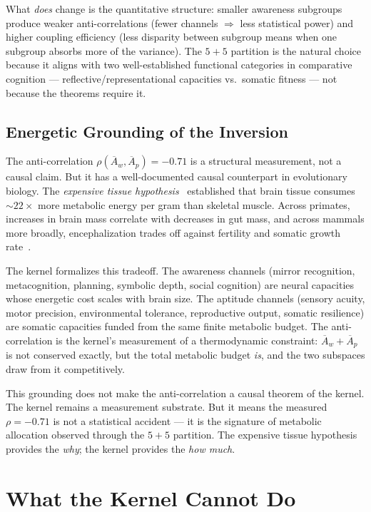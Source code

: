 \documentclass[
  aps,
  prd,
  twocolumn,
  superscriptaddress,
  nofootinbib,
  floatfix
]{revtex4-2}
\newcommand{\Aw}{\overline{A}_{\!w}}
\newcommand{\Ap}{\overline{A}_{\!p}}
\begin{document}
What \emph{does} change is the quantitative structure:
smaller awareness subgroups produce weaker anti-correlations
(fewer channels $\Rightarrow$ less statistical power) and
higher coupling efficiency (less disparity between subgroup
means when one subgroup absorbs more of the variance).
The $5\!+\!5$ partition is the natural choice because it
aligns with two well-established functional categories in
comparative cognition --- reflective/representational
capacities vs.\ somatic fitness --- not because the
theorems require it.

\subsection{Energetic Grounding of the Inversion}

The anti-correlation $\rho(\Aw, \Ap) = -0.71$ is a
structural measurement, not a causal claim.  But it has
a well-documented causal counterpart in evolutionary
biology.  The \emph{expensive tissue
hypothesis}~\cite{aiello1995expensive} established that
brain tissue consumes $\sim\!22\times$ more metabolic energy
per gram than skeletal muscle.  Across primates, increases
in brain mass correlate with decreases in gut mass, and
across mammals more broadly, encephalization trades off
against fertility and somatic growth
rate~\cite{isler2009expensive}.

The kernel formalizes this tradeoff.  The awareness channels
(mirror recognition, metacognition, planning, symbolic depth,
social cognition) are neural capacities whose energetic cost
scales with brain size.  The aptitude channels (sensory
acuity, motor precision, environmental tolerance,
reproductive output, somatic resilience) are somatic
capacities funded from the same finite metabolic budget.
The anti-correlation is the kernel's measurement of a
thermodynamic constraint: $\Aw + \Ap$ is not conserved
exactly, but the total metabolic budget \emph{is}, and
the two subspaces draw from it competitively.

This grounding does not make the anti-correlation a
causal theorem of the kernel.  The kernel remains a
measurement substrate.  But it means the measured
$\rho = -0.71$ is not a statistical accident --- it is
the signature of metabolic allocation observed through
the $5\!+\!5$ partition.  The expensive tissue hypothesis
provides the \emph{why}; the kernel provides the
\emph{how much}.

\section{What the Kernel Cannot Do}\label{sec:limits}
\end{document}
